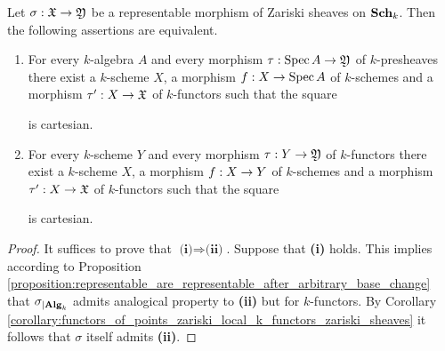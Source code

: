 \begin{corollary}\label{corollary:representable_morphisms_of_Zariski_sheaves}
Let $\sigma:{\mathfrak X}\rightarrow {\mathfrak Y}$ be a representable morphism of Zariski sheaves on $\mathbf{Sch}_k$. Then the following assertions are equivalent.
\begin{enumerate}[label=\emph{\textbf{(\roman*)}}, leftmargin=3.0em]
\item For every $k$-algebra $A$ and every morphism $\tau:\mathrm{Spec}\, A\rightarrow {\mathfrak Y}$ of $k$-presheaves there exist a $k$-scheme $X$, a morphism $f:X\rightarrow \mathrm{Spec}\, A$ of $k$-schemes and a morphism $\tau':X\rightarrow {\mathfrak X}$ of $k$-functors such that the square
\begin{center}
\end{center}
is cartesian.
\item For every $k$-scheme $Y$ and every morphism $\tau:Y\rightarrow {\mathfrak Y}$ of $k$-functors there exist a $k$-scheme $X$, a morphism $f:X\rightarrow Y$ of $k$-schemes and a morphism $\tau':X\rightarrow {\mathfrak X}$ of $k$-functors such that the square
\begin{center}
\end{center}
is cartesian.
\end{enumerate} 
\end{corollary}
\begin{proof}
It suffices to prove that $\textbf{(i)}\Rightarrow \textbf{(ii)}$. Suppose that \textbf{(i)} holds. This implies according to Proposition \ref{proposition:representable_are_representable_after_arbitrary_base_change} that $\sigma_{\mid \mathbf{Alg}_k}$ admits analogical property to \textbf{(ii)} but for $k$-functors. By Corollary \ref{corollary:functors_of_points_zariski_local_k_functors_zariski_sheaves} it follows that $\sigma$ itself admits \textbf{(ii)}.
\end{proof}




